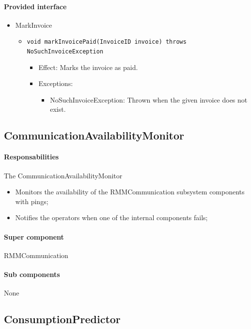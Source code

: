 \documentclass[a4paper,10pt]{article}
\begin{document}
\paragraph{Provided interface}
\begin{itemize}
	\item MarkInvoice
    \begin{itemize}
    	\item \texttt{void markInvoicePaid(InvoiceID invoice) throws NoSuchInvoiceException}
        \begin{itemize}
        	\item Effect: Marks the invoice as paid.
            \item Exceptions:
            \begin{itemize}
            	\item NoSuchInvoiceException: Thrown when the given invoice does not exist.
            \end{itemize}
        \end{itemize}
    \end{itemize}
\end{itemize}

\subsection{CommunicationAvailabilityMonitor}
\paragraph{Responsabilities} 
The CommunicationAvailabilityMonitor
\begin{itemize}
	\item Monitors the availability of the RMMCommunication subsystem components with pings;
    \item Notifies the operators when one of the internal components fails;
\end{itemize}

\paragraph{Super component} RMMCommunication

\paragraph{Sub components} None

\subsection{ConsumptionPredictor}
\end{document}
